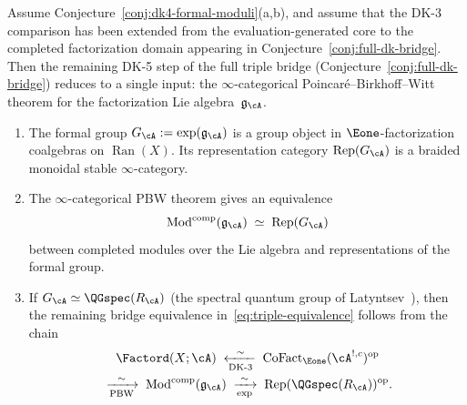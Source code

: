 \begin{conjecture}
\label{conj:dk5-infty-pbw}
Assume Conjecture~\textup{\ref{conj:dk4-formal-moduli}(a,b)}, and
assume that the DK-3 comparison has been extended from the
evaluation-generated core to the completed factorization domain
appearing in Conjecture~\textup{\ref{conj:full-dk-bridge}}.
Then the remaining DK-5 step of the full triple bridge
\textup{(}Conjecture~\textup{\ref{conj:full-dk-bridge}}\textup{)}
reduces to a single input: the $\infty$-categorical
Poincar\'e--Birkhoff--Witt theorem for the factorization Lie
algebra~$\mathfrak{g}_{\cA}$.
\begin{enumerate}[label=\textup{(\alph*)}]
\item The formal group
 $G_{\cA} := \exp(\mathfrak{g}_{\cA})$
 is a group object in $\Eone$-factorization coalgebras on
 $\operatorname{Ran}(X)$. Its representation category
 $\operatorname{Rep}(G_{\cA})$ is a braided monoidal stable
 $\infty$-category.
\item The $\infty$-categorical PBW theorem gives an equivalence
 \[
 \operatorname{Mod}^{\mathrm{comp}}(\mathfrak{g}_{\cA})
 \;\simeq\;
 \operatorname{Rep}(G_{\cA})
 \]
 between completed modules over the Lie algebra and
 representations of the formal group.
\item If $G_{\cA} \simeq \QGspec(R_{\cA})$
 \textup{(}the spectral quantum group of
 Latyntsev~\cite{Latyntsev23}\textup{)}, then the remaining bridge
 equivalence in~\eqref{eq:triple-equivalence} follows from the chain
 \begin{multline*}
 \Factord(X;\cA)
 \;\xleftarrow[\textup{DK-3}]{\sim}\;
 \operatorname{CoFact}_{\Eone}(\cA^{!,c})^{\mathrm{op}}
 \\
 \;\xrightarrow[\textup{PBW}]{\sim}\;
 \operatorname{Mod}^{\mathrm{comp}}(\mathfrak{g}_{\cA})
 \;\xrightarrow[\exp]{\sim}\;
 \operatorname{Rep}(\QGspec(R_{\cA}))^{\mathrm{op}}.
 \end{multline*}
\end{enumerate}
\end{conjecture}

